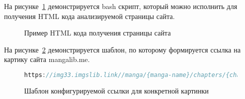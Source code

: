 
На рисунке~\ref{html-add} демонстрируется bash скрипт, который можно исполнить для получения HTML кода анализируемой страницы сайта.

\begin{figure}
    
    \caption{Пример HTML кода получения страницы сайта}
    \label{html-add}
\end{figure}

На рисунке~\ref{image-pattern-add} демонстрируется шаблон, по которому формируется ссылка на картику сайта mangalib.me.

\begin{figure}
    \begin{lstlisting}[language=go]
        https://img33.imgslib.link//manga/{manga-name}/chapters/{chapter-hash}/{image-hash}
    \end{lstlisting}
    \caption{Шаблон конфигурируемой ссылки для конкретной картинки}
    \label{image-pattern-add}
\end{figure}